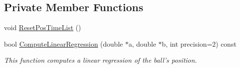 \subsection*{Private Member Functions}
\begin{DoxyCompactItemize}
\item 
void \hyperlink{classBallMonitor_a09ed61cf1852d45f03e7aacdebfe0175}{ResetPosTimeList} ()
\item 
bool \hyperlink{classBallMonitor_a49645db55ca752adbc2a5a074c7314be}{ComputeLinearRegression} (double $\ast$a, double $\ast$b, int precision=2) const 
\begin{DoxyCompactList}\small\item\em This function computes a linear regression of the ball's position. \item\end{DoxyCompactList}\end{DoxyCompactItemize}
